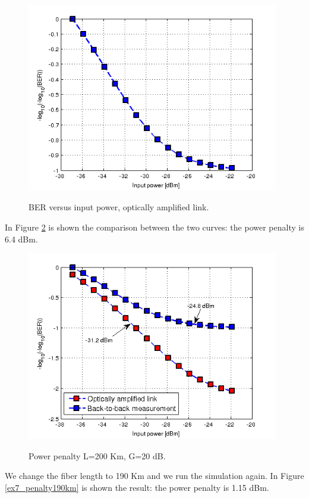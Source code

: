 \documentclass[a4paper,10pt]{report}
\begin{document}
\begin{figure}[!ht]
   \centering
   \includegraphics[width=11cm]{ex7_oa.png}\\
   \caption{BER versus input power, optically amplified link.}
   \label{ex7_oa}
\end{figure}

In Figure \ref{ex7_penalty} is shown the comparison between the two curves: the power penalty is 6.4 dBm.

\begin{figure}[!ht]
   \centering
   \includegraphics[width=11cm]{ex7_penalty.png}\\
   \caption{Power penalty L=200 Km, G=20 dB.}
   \label{ex7_penalty}
\end{figure}

We change the fiber length to 190 Km and we run the simulation again. In Figure \ref{ex7_penalty190km} is shown the result: the
power penalty is 1.15 dBm.
\end{document}
